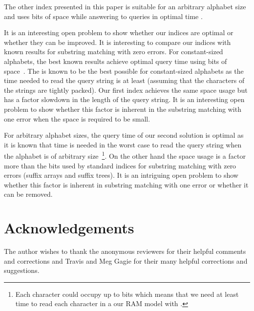 \documentclass{article}
\newcommand{\?}{\mskip1.5mu}
\begin{document}
The other index presented in this paper is suitable for an arbitrary alphabet size and uses  bits of space while answering to queries in optimal time . 

It is an interesting open problem to show whether our indices are optimal or whether they can be improved. It is interesting to compare our indices with known results for substring matching with zero errors. For constant-sized alphabets, the best known results achieve  optimal  query time using  bits of space~\cite{GV05}. The  is known to be the best possible for constant-sized alphabets as the time needed to read the query string is at least  (assuming that the characters of the strings are tightly packed). Our first index achieves the same space usage but has a  factor slowdown in the length of the query string. It is an interesting open problem to show whether this  factor is inherent in the substring matching with one error when the space is required to be small. 

For arbitrary alphabet sizes, the  query time of our second solution is optimal as it is known that  time is needed in the worst case to read the query string when the alphabet is of arbitrary size~\footnote{Each character could occupy up to  bits which means that we need at least  time to read each character in a our RAM model with .}. On the other hand the space usage  is a factor  more than the  bits used by standard indices for substring matching with zero errors (suffix arrays and suffix trees). It is an intriguing open problem to show whether this  factor is inherent in substring matching with one error or whether it can be removed. 

\section*{Acknowledgements}
The author wishes to thank the anonymous reviewers for their helpful comments and corrections
and Travis and Meg Gagie for their many helpful corrections and suggestions. 


\small 
 
\normalsize

\newpage
\end{document}
